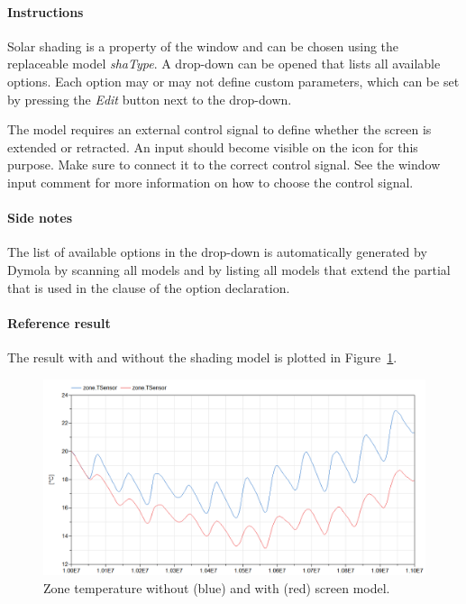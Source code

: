 \documentclass[10pt,a4paper]{article}
\begin{document}
\paragraph{Instructions}
Solar shading is a property of the window and can be chosen using the 
replaceable model \textit{shaType}. 
A drop-down can be opened that lists all available options.
Each option may or may not define custom parameters,
which can be set by pressing the \textit{Edit} button next to the drop-down.

The  model requires an external control signal to define
whether the screen is extended or retracted. 
An input should become visible on the  icon for this
purpose. Make sure to connect it to the correct control signal.
See the window input comment for more information on how
to choose the control signal.

\paragraph{Side notes}
The list of available options in the drop-down is automatically generated by
Dymola by scanning all models and by listing all models that extend the partial
that is used in the  clause of the option declaration.

\paragraph{Reference result}
The result with and without the shading model
is plotted in Figure~\ref{fig:res2}.

\begin{figure}[h!]
\centering
\includegraphics[scale=0.65]{Example2.png}
\caption{Zone temperature without (blue) and with (red) screen model.}
\label{fig:res2}
\end{figure}
\end{document}
